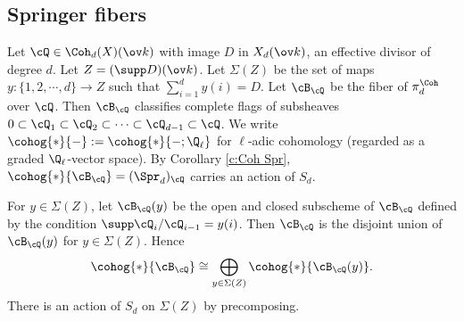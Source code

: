 \subsection{Springer fibers}\label{ss:Spr fiber}
Let $\cQ\in \Coh_{d}(X)(\ov k)$ with image $D$ in $X_{d}(\ov k)$, an effective divisor of degree $d$.  Let $Z=(\supp D)(\ov k)$. Let $\Sigma(Z)$ be the set of maps $y:\{1,2,\cdots, d\}\to Z$ such that $\sum_{i=1}^{d}y(i)=D$. Let $\cB_{\cQ}$  be the fiber of $\pi^{\Coh}_{d}$ over $\cQ$. Then $\cB_{\cQ}$ classifies complete flags of subsheaves $0\subset \cQ_{1}\subset \cQ_{2}\subset\cdots\subset \cQ_{d-1}\subset \cQ$. We write $\cohog{*}{-} := \cohog{*}{-; \Q_\ell}$ for $\ell$-adic cohomology (regarded as a graded $\Q_{\ell}$-vector space). By Corollary \ref{c:Coh Spr}, $\cohog{*}{\cB_{\cQ}}=(\Spr_{d})_{\cQ}$ carries an action of $S_{d}$.

For $y\in \Sigma(Z)$, let $\cB_{\cQ}(y)$ be the open and closed subscheme of $\cB_{\cQ}$ defined by the condition $\supp\cQ_{i}/\cQ_{i-1}=y(i)$. Then $\cB_{\cQ}$ is the disjoint union of $\cB_{\cQ}(y)$ for $y\in \Sigma(Z)$. Hence
\begin{equation*}
\cohog{*}{\cB_{\cQ}}\cong \bigoplus_{y\in \Sigma(Z)}\cohog{*}{\cB_{\cQ}(y)}.
\end{equation*}
There is an action of $S_{d}$ on $\Sigma(Z)$ by precomposing.

